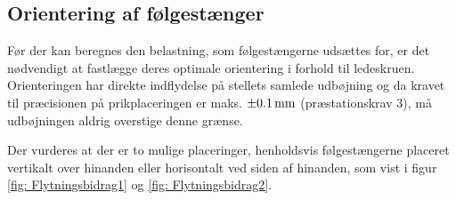 \subsection{Orientering af følgestænger}\label{afs: Orientering af stænger}


Før der kan beregnes den belastning, som følgestængerne udsættes for, er det nødvendigt at fastlægge deres optimale orientering i forhold til ledeskruen. Orienteringen har direkte indflydelse på stellets samlede udbøjning og da kravet til præcisionen på prikplaceringen er maks. $\SI{\pm0,1}{mm}$ (præstationskrav 3), må udbøjningen aldrig overstige denne grænse. 

Der vurderes at der er to mulige placeringer, henholdsvis følgestængerne placeret vertikalt over hinanden eller horisontalt ved siden af hinanden, som vist i figur \ref{fig: Flytningsbidrag1} og \ref{fig: Flytningsbidrag2}.

